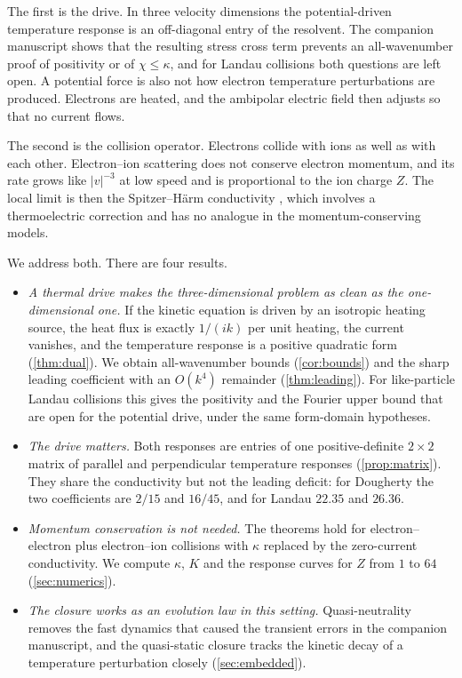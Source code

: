 \documentclass[11pt]{article}
\newcommand{\kap}{\kappa}
\theoremstyle{definition}
\theoremstyle{remark}
\numberwithin{equation}{section}
\begin{document}
The first is the drive. In three velocity dimensions the potential-driven
temperature response is an off-diagonal entry of the resolvent. The
companion manuscript shows that the resulting stress cross term prevents
an all-wavenumber proof of positivity or of $\chi\leq\kap$, and for Landau
collisions both questions are left open. A potential force is also not
how electron temperature perturbations are produced. Electrons are
heated, and the ambipolar electric field then adjusts so that no current
flows.

The second is the collision operator. Electrons collide with ions as well
as with each other. Electron--ion scattering does not conserve electron
momentum, and its rate grows like $|v|^{-3}$ at low speed and is
proportional to the ion charge $Z$. The local limit is then the
Spitzer--H\"arm conductivity \cite{SpitzerHarm1953,Braginskii1965}, which
involves a thermoelectric correction and has no analogue in the
momentum-conserving models.

We address both. There are four results.
\begin{itemize}
\item \emph{A thermal drive makes the three-dimensional problem as clean
as the one-dimensional one.} If the kinetic equation is driven by an
isotropic heating source, the heat flux is exactly $1/(ik)$ per unit
heating, the current vanishes, and the temperature response is a positive
quadratic form (\cref{thm:dual}). We obtain all-wavenumber bounds
(\cref{cor:bounds}) and the sharp leading coefficient with an $O(k^4)$
remainder (\cref{thm:leading}). For like-particle Landau collisions this
gives the positivity and the Fourier upper bound that are open for the
potential drive, under the same form-domain hypotheses.
\item \emph{The drive matters.} Both responses are entries of one
positive-definite $2\times2$ matrix of parallel and perpendicular
temperature responses (\cref{prop:matrix}). They share the conductivity
but not the leading deficit: for Dougherty the two coefficients are
$2/15$ and $16/45$, and for Landau $22.35$ and $26.36$.
\item \emph{Momentum conservation is not needed.} The theorems hold for
electron--electron plus electron--ion collisions with $\kap$ replaced by
the zero-current conductivity. We compute $\kap$, $K$ and the response
curves for $Z$ from $1$ to $64$ (\cref{sec:numerics}).
\item \emph{The closure works as an evolution law in this setting.}
Quasi-neutrality removes the fast dynamics that caused the transient
errors in the companion manuscript, and the quasi-static closure tracks
the kinetic decay of a temperature perturbation closely
(\cref{sec:embedded}).
\end{itemize}
\end{document}
